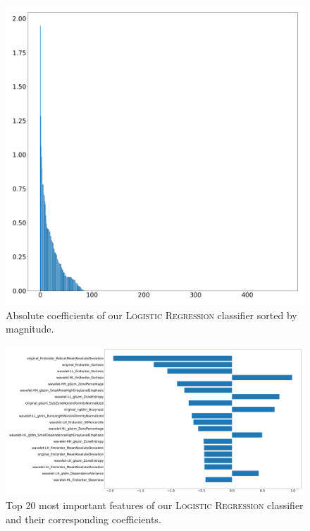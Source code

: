 \begin{figure}[t]
    \centering
    \includegraphics[width=0.8\linewidth]{figures/logistic_regression_feature_importance.png}
    \caption{Absolute coefficients of our \textsc{Logistic Regression} classifier sorted by magnitude.}
    \label{fig:coeffslogreg}
\end{figure}  %

\begin{figure}[t]
    \centering
    \includegraphics[width=1\linewidth]{figures/logistic_regression_top20.png}
    \caption{Top 20 most important features of our \textsc{Logistic Regression} classifier and their corresponding coefficients.}
    \label{fig:top20logreg}
\end{figure}

